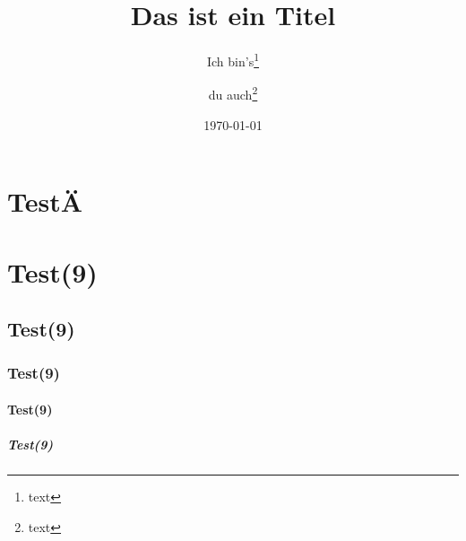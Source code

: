 \documentclass[ngerman,%
cd=full,%
tudscrver=2.05,%
cdoldfont=onlydin,
chapterprefix=true,
]{tudscrreprt}
\begin{document}
\providecommand*\TUDoptions[1]{}
\makeatletter


%
\section{TestÄ}\blindtext
\section{Test(9)}\blindtext
\subsection{Test(9)}\blindtext
\subsubsection{Test(9)}\blindtext
\paragraph{Test(9)}\blindtext
\subparagraph{Test(9)}\blindtext
%

\date{\today}
\title{Das ist ein Titel}
\author{Ich bin's\thanks{text}\and du auch\thanks{text}}








\end{document}
